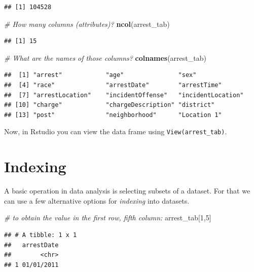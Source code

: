 \documentclass[]{book}
\newenvironment{Shaded}{\begin{snugshade}}{\end{snugshade}}
\newcommand{\KeywordTok}[1]{\textcolor[rgb]{0.13,0.29,0.53}{\textbf{#1}}}
\newcommand{\DecValTok}[1]{\textcolor[rgb]{0.00,0.00,0.81}{#1}}
\newcommand{\CommentTok}[1]{\textcolor[rgb]{0.56,0.35,0.01}{\textit{#1}}}
\newcommand{\NormalTok}[1]{#1}
\theoremstyle{definition}
\theoremstyle{definition}
\theoremstyle{remark}
\begin{document}
\begin{verbatim}
## [1] 104528
\end{verbatim}

\begin{Shaded}
\begin{Highlighting}[]
\CommentTok{# How many columns (attributes)?}
\KeywordTok{ncol}\NormalTok{(arrest_tab)}
\end{Highlighting}
\end{Shaded}

\begin{verbatim}
## [1] 15
\end{verbatim}

\begin{Shaded}
\begin{Highlighting}[]
\CommentTok{# What are the names of those columns?}
\KeywordTok{colnames}\NormalTok{(arrest_tab)}
\end{Highlighting}
\end{Shaded}

\begin{verbatim}
##  [1] "arrest"            "age"               "sex"              
##  [4] "race"              "arrestDate"        "arrestTime"       
##  [7] "arrestLocation"    "incidentOffense"   "incidentLocation" 
## [10] "charge"            "chargeDescription" "district"         
## [13] "post"              "neighborhood"      "Location 1"
\end{verbatim}

Now, in Rstudio you can view the data frame using
\texttt{View(arrest\_tab)}.

\section{Indexing}\label{indexing}

A basic operation in data analysis is selecting subsets of a dataset.
For that we can use a few alternative options for \emph{indexing} into
datasets.

\begin{Shaded}
\begin{Highlighting}[]
\CommentTok{# to obtain the value in the first row, fifth column:}
\NormalTok{arrest_tab[}\DecValTok{1}\NormalTok{,}\DecValTok{5}\NormalTok{]}
\end{Highlighting}
\end{Shaded}

\begin{verbatim}
## # A tibble: 1 x 1
##   arrestDate
##        <chr>
## 1 01/01/2011
\end{verbatim}
\end{document}
